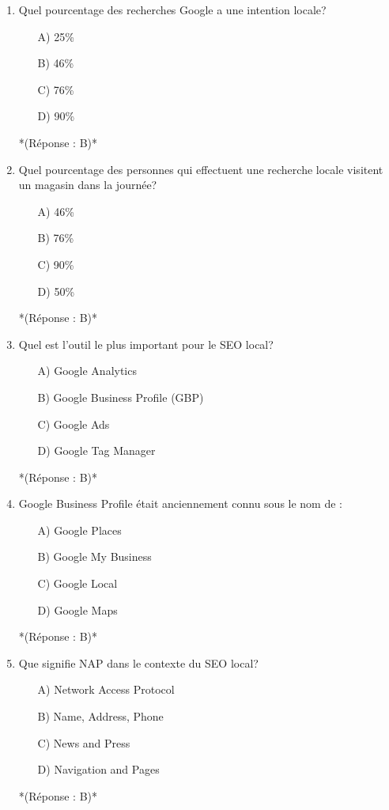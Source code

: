 \documentclass[12pt,a4paper,twoside]{report}
\begin{document}
\begin{enumerate}
\item Quel pourcentage des recherches Google a une intention locale?
\begin{itemize}
\item[A)] 25\%
\item[B)] 46\%
\item[C)] 76\%
\item[D)] 90\%
\end{itemize}
*(Réponse : B)*

\item Quel pourcentage des personnes qui effectuent une recherche locale visitent un magasin dans la journée?
\begin{itemize}
\item[A)] 46\%
\item[B)] 76\%
\item[C)] 90\%
\item[D)] 50\%
\end{itemize}
*(Réponse : B)*

\item Quel est l'outil le plus important pour le SEO local?
\begin{itemize}
\item[A)] Google Analytics
\item[B)] Google Business Profile (GBP)
\item[C)] Google Ads
\item[D)] Google Tag Manager
\end{itemize}
*(Réponse : B)*

\item Google Business Profile était anciennement connu sous le nom de :
\begin{itemize}
\item[A)] Google Places
\item[B)] Google My Business
\item[C)] Google Local
\item[D)] Google Maps
\end{itemize}
*(Réponse : B)*

\item Que signifie NAP dans le contexte du SEO local?
\begin{itemize}
\item[A)] Network Access Protocol
\item[B)] Name, Address, Phone
\item[C)] News and Press
\item[D)] Navigation and Pages
\end{itemize}
*(Réponse : B)*


\end{enumerate}
\end{document}
